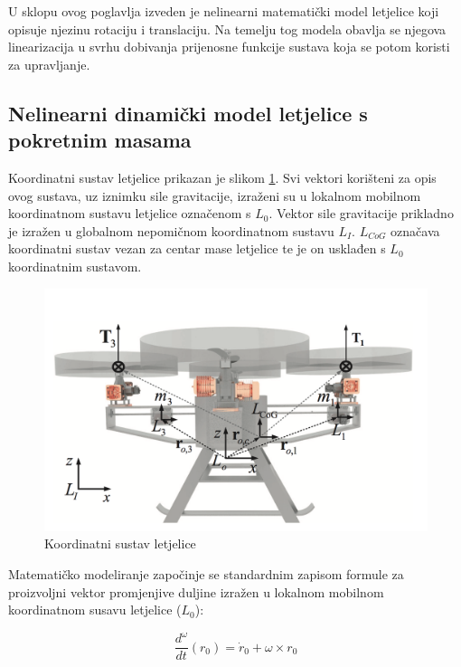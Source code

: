 \documentclass[11pt,a4paper]{article}
\begin{document}
U sklopu ovog poglavlja izveden je nelinearni matematički model letjelice koji opisuje njezinu rotaciju i translaciju. Na temelju tog modela obavlja se njegova linearizacija u svrhu dobivanja prijenosne funkcije sustava koja se potom koristi za upravljanje. 

\medskip

\subsection{Nelinearni dinamički model letjelice s pokretnim masama}

Koordinatni sustav letjelice prikazan je slikom \ref{fig:mod}. Svi vektori korišteni za opis ovog sustava, uz iznimku sile gravitacije, izraženi su u lokalnom mobilnom koordinatnom sustavu letjelice označenom s $L_{0}$. Vektor sile gravitacije prikladno je izražen u globalnom nepomičnom koordinatnom sustavu $L_{I}$. $L_{CoG}$ označava koordinatni sustav vezan za centar mase letjelice te je on usklađen s $L_{0}$ koordinatnim sustavom.


\begin{figure}[H]
	\centering
	\includegraphics[scale=0.23]{model}
	\caption{Koordinatni sustav letjelice \cite{haus1}}
	\label{fig:mod}
\end{figure}

Matematičko modeliranje započinje se standardnim zapisom formule za proizvoljni vektor promjenjive duljine izražen u lokalnom mobilnom koordinatnom susavu letjelice ($L_{0}$):

\begin{equation}
\frac{d^{\omega}}{dt}({r}_{0}) =  {\dot{r}}_{0} + {\omega} \times {r}_{0} 
\label{eq:r0}
\end{equation}
\end{document}

